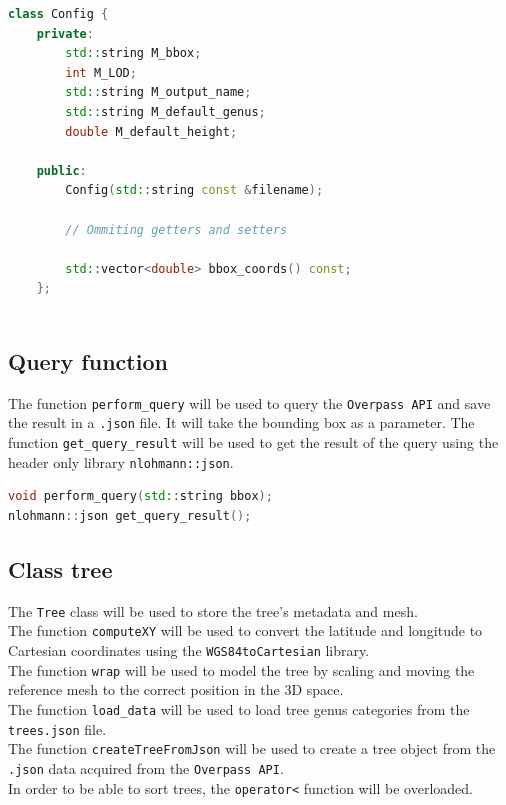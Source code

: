\documentclass[12pt]{article}
\begin{document}
\begin{lstlisting}[language=C++]
class Config {
    private:
        std::string M_bbox;
        int M_LOD;
        std::string M_output_name;
        std::string M_default_genus;
        double M_default_height;
    
    public:
        Config(std::string const &filename);

        // Ommiting getters and setters

        std::vector<double> bbox_coords() const;
    };
    
\end{lstlisting}

\subsection{Query function}

The function \texttt{perform\_query} will be used to query the \texttt{Overpass API}
and save the result in a \texttt{.json} file. It will take the bounding box as a
parameter.
The function \texttt{get\_query\_result} will be used to get the result of the query
using the header only library \texttt{nlohmann::json}.

\begin{lstlisting}[language=C++]
void perform_query(std::string bbox);
nlohmann::json get_query_result();
\end{lstlisting}

\subsection{Class tree}

The \texttt{Tree} class will be used to store the tree's metadata and mesh. \\
The function \texttt{computeXY} will be used to convert the latitude and longitude
to Cartesian coordinates using the \texttt{WGS84toCartesian} library. \\
The function \texttt{wrap} will be used to model the tree by scaling and moving
the reference mesh to the correct position in the 3D space. \\
The function \texttt{load\_data} will be used to load tree genus categories from
the \texttt{trees.json} file. \\
The function \texttt{createTreeFromJson} will be used to create a tree object from
the \texttt{.json} data acquired from the \texttt{Overpass API}. \\
In order to be able to sort trees, the \texttt{operator<} function will be overloaded.
\end{document}
